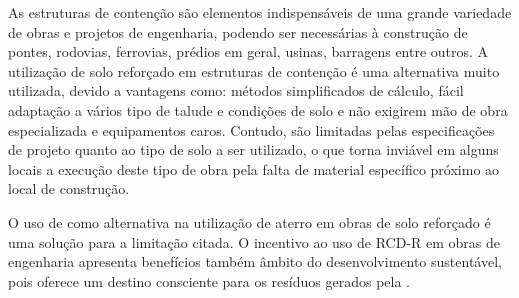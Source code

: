 As estruturas de contenção são elementos indispensáveis de uma grande variedade de obras e projetos de engenharia, podendo ser necessárias à construção de pontes, rodovias, ferrovias, prédios em geral, usinas, barragens entre outros. A utilização de solo reforçado em estruturas de contenção é uma alternativa muito utilizada, devido a vantagens como: métodos simplificados de cálculo, fácil adaptação a vários tipo de talude e condições de solo e não exigirem mão de obra especializada e equipamentos caros.
Contudo,  são limitadas pelas especificações de projeto quanto ao tipo de solo a ser utilizado, o que torna inviável em alguns locais a execução deste tipo de obra pela falta de material específico próximo ao local de construção. 

O uso de  como alternativa na utilização de aterro em obras de solo reforçado é uma solução para a limitação citada. O incentivo ao uso de RCD-R em obras de engenharia apresenta benefícios também âmbito do desenvolvimento sustentável, pois oferece um destino consciente para os resíduos gerados pela .

